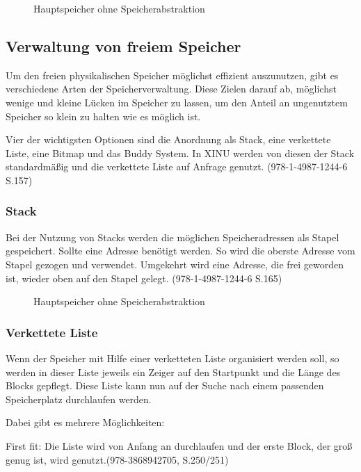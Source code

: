 \begin{figure}[htb]
	\centering
	\caption{Hauptspeicher ohne Speicherabstraktion}
\end{figure}

\subsection{Verwaltung von freiem Speicher}
\label{subsec:VerwaltungFreiemSpeicher}
Um den freien physikalischen Speicher möglichst effizient auszunutzen, gibt es verschiedene Arten der Speicherverwaltung. Diese Zielen darauf ab, möglichst wenige und kleine Lücken im Speicher zu lassen, um den Anteil an ungenutztem Speicher so klein zu halten wie es möglich ist.

Vier der wichtigsten Optionen sind die Anordnung als Stack, eine verkettete Liste, eine Bitmap und das Buddy System. In XINU werden von diesen der Stack standardmäßig und die verkettete Liste auf Anfrage genutzt. (978-1-4987-1244-6 S.157)

\subsubsection{Stack}
Bei der Nutzung von Stacks werden die möglichen Speicheradressen als Stapel gespeichert. Sollte eine Adresse benötigt werden. So wird die oberste Adresse vom Stapel gezogen und verwendet. Umgekehrt wird eine Adresse, die frei geworden ist, wieder oben auf den Stapel gelegt. (978-1-4987-1244-6 S.165)

\begin{figure}[htb]
	\centering
	\caption{Hauptspeicher ohne Speicherabstraktion}
\end{figure}

\subsubsection{Verkettete Liste}
Wenn der Speicher mit Hilfe einer verketteten Liste organisiert werden soll, so werden in dieser Liste jeweils ein Zeiger auf den Startpunkt und die Länge des Blocks gepflegt. Diese Liste kann nun auf der Suche nach einem passenden Speicherplatz durchlaufen werden. 

Dabei gibt es mehrere Möglichkeiten:

First fit: Die Liste wird von Anfang an durchlaufen und der erste Block, der groß genug ist, wird genutzt.(978-3868942705, S.250/251)

